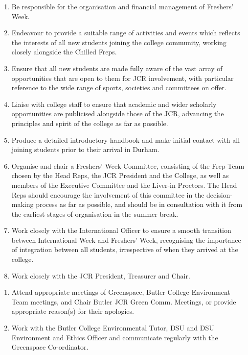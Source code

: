 \begin{enumerate}
    \item Be responsible for the organisation and financial management of Freshers' Week.
    \item Endeavour to provide a suitable range of activities and events which reflects the interests of all new students joining the college community, working closely alongside the Chilled Freps.
    \item Ensure that all new students are made fully aware of the vast array of opportunities that are open to them for JCR involvement, with particular reference to the wide range of sports, societies and committees on offer.
    \item Liaise with college staff to ensure that academic and wider scholarly opportunities are publicised alongside those of the JCR, advancing the principles and spirit of the college as far as possible.
    \item Produce a detailed introductory handbook and make initial contact with all joining students prior to their arrival in Durham.
    \item Organise and chair a Freshers' Week Committee, consisting of the Frep Team chosen by the Head Reps, the JCR President and the College, as well as members of the Executive Committee and the Liver-in Proctors. The Head Reps should encourage the involvement of this committee in the decision-making process as far as possible, and should be in consultation with it from the earliest stages of organisation in the summer break.
    \item Work closely with the International Officer to ensure a smooth transition between International Week and Freshers' Week, recognising the importance of integration between all students, irrespective of when they arrived at the college.
    \item Work closely with the JCR President, Treasurer and Chair.
    
\end{enumerate}


\begin{enumerate}
    \item Attend appropriate meetings of Greenspace, Butler College Environment Team meetings, and Chair Butler JCR Green Comm. Meetings, or provide appropriate reason(s) for their apologies.
    \item Work with the Butler College Environmental Tutor, DSU and DSU Environment and Ethics Officer and communicate regularly with the Greenspace Co-ordinator.
    
\end{enumerate}

